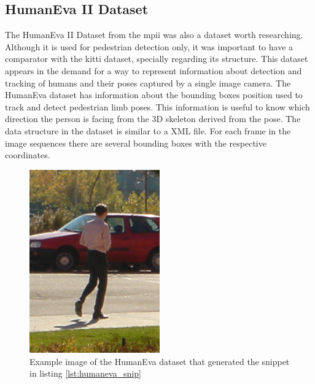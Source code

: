 \subsection{HumanEva II Dataset}
The HumanEva II Dataset from the \gls{mpii} was also a dataset worth researching. Although it is used for pedestrian detection only, it was important to have a comparator with the \gls{kitti} dataset, specially regarding its structure. 
This dataset appears in the demand for a way to represent information about detection and tracking of humans and their poses captured by a single image camera. The HumanEva dataset has information about the bounding boxes position used to track and detect pedestrian limb poses. This information is useful to know which direction the person is facing from the 3D skeleton derived from the pose. The data structure in the dataset is similar to a XML file. For each frame in the image sequences there are several bounding boxes with the respective coordinates. \cite{Sigal}

\begin{figure}

\end{figure}

\begin{figure}[htp]
	
	\centering
	\includegraphics[width=0.5\textwidth]{capstate/imgs/00050.png}
	
	\caption{Example image of the HumanEva dataset that generated the snippet in listing \ref{lst:humaneva_snip} }
	\label{fig:00050}
	
\end{figure}

